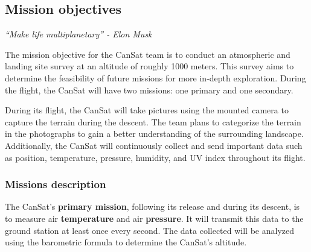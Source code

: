 \documentclass[11pt]{article}
\begin{document}
\subsection{Mission objectives}

{\textit{“Make life multiplanetary” - Elon Musk}}
\vspace{0.5cm}

The mission objective for the CanSat team is to conduct an atmospheric and landing site survey at an altitude of roughly 1000 meters. This survey aims to determine the feasibility of future missions for more in-depth exploration. During the flight, the CanSat will have two missions: one primary and one secondary.

During its flight, the CanSat will take pictures using the mounted camera to capture the terrain during the descent. The team plans to categorize the terrain in the photographs to gain a better understanding of the surrounding landscape. Additionally, the CanSat will continuously collect and send important data such as position, temperature, pressure, humidity, and UV index throughout its flight.

\subsubsection{Missions description}

The CanSat's \textbf{primary mission}, following its release and during its descent, is to measure air \textbf{temperature} and air \textbf{pressure}. It will transmit this data to the ground station at least once every second. The data collected will be analyzed using the barometric formula to determine the CanSat's altitude.
\end{document}
